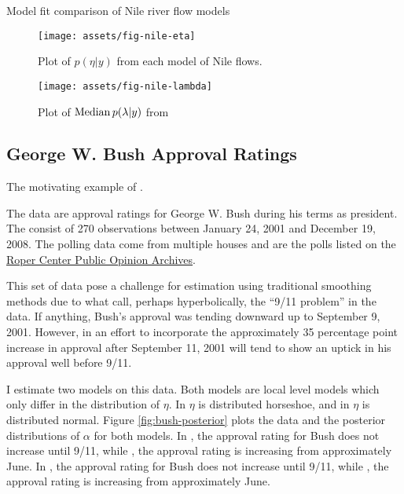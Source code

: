 \documentclass{article}
\begin{document}
\begin{table}[htpb]
  \centering
  
  \caption{Model fit comparison of Nile river flow models}
  \label{tab:nile-fits}
\end{table}

\begin{figure}[htpb]
  \centering
  \texttt{[image: assets/fig-nile-eta]}
  \caption{Plot of $p(\eta | y)$ from each model of Nile flows.}
  \label{fig:nile-eta}
\end{figure}

\begin{figure}[htpb]
  \centering
  \texttt{[image: assets/fig-nile-lambda]}
  \caption{Plot of $\operatorname{Median} p(\lambda | y)$ from }
  \label{fig:nile-lambda}
\end{figure}

\clearpage{}

\subsection{George W. Bush Approval Ratings}
\label{sec:george-w.-bush}

The motivating example of \textcite{RatkovicEng2010}.

The data are approval ratings for George W. Bush during his terms as president.
The consist of 270 observations between January 24, 2001 and December 19, 2008.%
The polling data come from multiple houses and are the polls listed on the \href{http://webapps.ropercenter.uconn.edu/CFIDE/roper/presidential/webroot/presidential_rating_detail.cfm?allRate=True&presidentName=Bush#.UbeB8HUbyv8}{Roper Center Public Opinion Archives}.

This set of data pose a challenge for estimation using traditional smoothing methods due to what \textcite{RatkovicEng2010} call, perhaps hyperbolically, the ``9/11 problem'' in the data.
If anything, Bush's approval was tending downward up to September 9, 2001.
However, in an effort to incorporate the approximately 35 percentage point increase in approval after September 11, 2001 will tend to show an uptick in his approval well before 9/11.

I estimate two models on this data. 
Both models are local level models which only differ in the distribution of $\eta$.
In  $\eta$ is distributed horseshoe, and in  $\eta$ is distributed normal.
Figure \ref{fig:bush-posterior} plots the data and the posterior distributions of $\alpha$ for both models.
In , the approval rating for Bush does not increase until 9/11, while , the approval rating is increasing from approximately June.
In , the approval rating for Bush does not increase until 9/11, while , the approval rating is increasing from approximately June.
\end{document}
